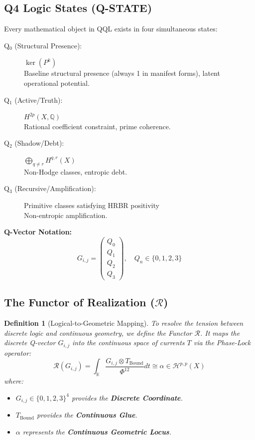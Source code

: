 \documentclass[11pt, letterpaper]{article}
\newtheorem{definition}[theorem]{Definition}
\begin{document}
\subsection{Q4 Logic States (Q-STATE)}\label{sec:3.1}

Every mathematical object in QQL exists in four simultaneous states:

\begin{description}
    \item[Q$_0$ (Structural Presence):] $\ker(P^k)$ \\
    Baseline structural presence (always 1 in manifest forms), latent operational potential.

    \item[Q$_1$ (Active\slash Truth):] $H^{2p}(X, \mathbb{Q})$ \\
    Rational coefficient constraint, prime coherence.

    \item[Q$_2$ (Shadow\slash Debt):] $\bigoplus_{q \ne r} H^{q,r}(X)$ \\
    Non-Hodge classes, entropic debt.

    \item[Q$_3$ (Recursive\slash Amplification):] Primitive classes satisfying HRBR positivity \\
    Non-entropic amplification.
\end{description}

\textbf{Q-Vector Notation:}
\[
G_{i, j} = \begin{pmatrix} Q_0 \\ Q_1 \\ Q_2 \\ Q_3 \end{pmatrix}, \quad Q_n \in \{0, 1, 2, 3\}
\]

\subsection{The Functor of Realization ($\mathcal{R}$)}\label{sec:3.2}

\begin{definition}[Logical-to-Geometric Mapping]
To resolve the tension between discrete logic and continuous geometry, we define the Functor $\mathcal{R}$. It maps the discrete Q-vector $G_{i,j}$ into the continuous space of currents $T$ via the Phase-Lock operator:
\[ \mathcal{R}(G_{i,j}) = \int_{\mathbb{K}} \frac{G_{i,j} \otimes T_{\text{Bound}}}{\Phi^{12}} dt \cong \alpha \in \mathcal{H}^{p,p}(X) \]
where:
\begin{itemize}
    \item $G_{i,j} \in \{0,1,2,3\}^4$ provides the \textbf{Discrete Coordinate}.
    \item $T_{\text{Bound}}$ provides the \textbf{Continuous Glue}.
    \item $\alpha$ represents the \textbf{Continuous Geometric Locus}.
\end{itemize}
\end{definition}
\end{document}
